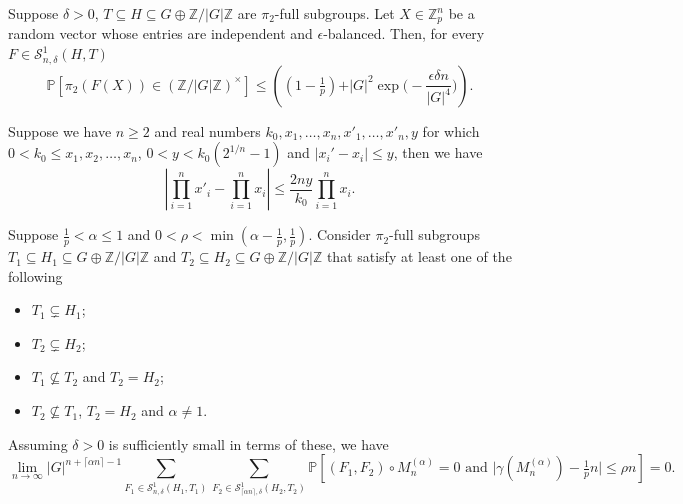 \documentclass[10pt,a4paper]{amsart}
\newcommand{\Mna}{M_{n}^{(\alpha)}}
\newcommand{\PPP}{\mathbb{P}}
\newcommand{\SSO}[3]{\mathcal{S}^1_{#1}(#2,#3)}
\newcommand{\Z}{\mathbb{Z}}
\newcommand{\ZG}{\Z/\abs{G}\Z}
\newcommand{\Zp}{\Z_p}
\newcommand{\abs}[1]{\vert#1\vert}
\newcommand{\ceil}[1]{\lceil#1\rceil}
\begin{document}
\begin{corollary}\label{Cor: prob pi_2 is unit}
Suppose $\delta>0$, $T\subseteq H\subseteq G\oplus\ZG$ are $\pi_2$-full subgroups.
Let $X\in\Zp^n$ be a random vector whose entries are independent and $\epsilon$-balanced.
Then, for every $F\in\SSO{n,\delta}{H}{T}$
\[
\PPP[\pi_2(F(X))\in (\ZG)^{\times}]
\leq 
 \left( (1-\tfrac{1}{p})
 +\abs{G}^2\exp\Big(-\frac{\epsilon\delta n}{|G|^4}\Big) \right).
\]
\end{corollary}

\begin{corollary}\label{Cor: estimate product}
Suppose we have $n\geq 2$ and real numbers $k_0,x_1,\dots,x_n,x'_1,\dots,x'_n,y$ for which $0<k_0\leq x_1,x_2,\dots,x_n$, $0<y<k_0(2^{1/n}-1)$ and $|x_i'-x_i|\leq y$, then we have
\[\left|\prod_{i=1}^n x'_i -\prod_{i=1}^n x_i\right|\leq \frac{2ny}{k_0} \prod_{i=1}^n x_i.\]
\end{corollary}

\begin{proposition}\label{Prop: Laplacian error term}
Suppose $\frac{1}{p}<\alpha\leq 1$ and $0<\rho< \min(\alpha-\frac{1}{p},\frac{1}{p})$.
Consider $\pi_2$-full subgroups $T_1\subseteq H_1\subseteq G\oplus\ZG$ and $T_2\subseteq H_2\subseteq G\oplus\ZG$ that satisfy at least one of the following
\begin{itemize}
    \item $T_1\subsetneq H_1$;
    \item $T_2\subsetneq H_2$;
    \item $T_1\not\subseteq T_2$ and $T_2=H_2$;
    \item $T_2\not\subseteq T_1$, $T_2=H_2$ and $\alpha\neq 1$.
\end{itemize}
Assuming $\delta>0$ is sufficiently small in terms of these, we have
\[
\lim_{n\to\infty}
\abs{G}^{n+\ceil{\alpha n}-1}
\sum_{F_1\in \SSO{n,\delta}{H_1}{T_1}}
\sum_{F_2\in \SSO{\ceil{\alpha n},\delta}{H_2}{T_2}}
\PPP[(F_1,F_2)\circ \Mna=0 \text{ and } \abs{\gamma(\Mna)-\tfrac{1}{p}n} \leq \rho n]
=0.
\]
\end{proposition}
\end{document}
